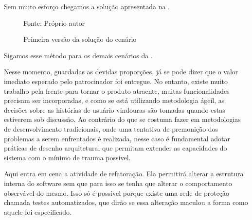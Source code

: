   Sem muito esforço chegamos a solução apresentada na .

  \begin{figure}[h]
    \centering
    \caption{Primeira versão da solução do cenário}
    \small{Fonte: Próprio autor}
    \label{fig:primeira-solucao}
  \end{figure}

  Sigamos esse método para os demais cenários da .

  Nesse momento, guardadas as devidas proporções, já se pode dizer que o valor imediato esperado pelo patrocinador foi entregue. No entanto, existe muito trabalho pela frente para tornar o produto atraente, muitas funcionalidades precisam ser incorporadas, e como se está utilizando metodologia ágeil, as decisões sobre as histórias de usuário vindouras são tomadas quando estas estiverem sob discussão. Ao contrário do que se costuma fazer em metodologias de desenvolvimento tradicionais, onde uma tentativa de premonição dos problemas a serem enfrentados é realizada, nesse caso é fundamental adotar práticas de desenho arquitetural que permitam extender as capacidades do sistema com o mínimo de trauma possível.

  Aqui entra em cena a atividade de refatoração. Ela permitirá alterar a estrutura interna do software sem que para isso se tenha que alterar o comportamento observável do mesmo. Isso só é possível porque existe uma rede de proteção chamada testes automatizados, que dirão se essa alteração maculou a forma como aquele foi especificado.

